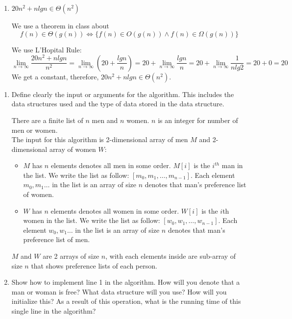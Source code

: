 \documentclass{cpsc413Solutions}
\begin{document}
\begin{problemlist}
\begin{problem}
\begin{answer}
\begin{enumerate}
    \item $20n^2 + nlgn \in \Theta(n^2)$
    
    We use a theorem in class about \[f(n) \in \Theta(g(n)) \Leftrightarrow  \{f(n) \in O(g(n)) \land f(n) \in \Omega(g(n))\}\]
    
    We use L'Hopital Rule:
    $$ \lim_{n\to\infty} \frac{20n^2 + nlgn}{n^2} = \lim_{n\to\infty} (20 + \frac{lgn}{n}) = 20+ \lim_{n\to\infty} \frac{lgn}{n}= 20 + \lim_{n\to\infty} \frac{1}{nlg2}=20+0 = 20$$
    We get a constant, therefore, $20n^2 + nlgn \in \Theta(n^2)$.
    
\end{enumerate}
\end{answer}
\end{problem}


\begin{problem}
\begin{answer}
\begin{enumerate}
    \item Define clearly the input or arguments for the algorithm. This includes the data structures used and the type of data stored in the data structure. 
    
    There are a finite list of $n$ men and $n$ women. $n$ is an integer for number of men or women.\\
    The input for this algorithm is 2-dimensional array of men $M$ and 2-dimensional array of women $W$:
    \begin{itemize}
        \item $M$ has $n$ elements denotes all men in some order. $M[i]$ is the $i^{th}$ man in the list. We write the list as follow: $[m_0,m_1,\dots, m_{n-1}]$. Each element $m_0, m_1 \dots$ in the list is an array of size $n$ denotes that man's preference list of women.
        \item $W$ has $n$ elements denotes all women in some order. $W[i]$ is the $i$th women in the list. We write the list as follow: $[w_0,w_1,\dots, w_{n-1}]$. Each element $w_0, w_1 \dots$ in the list is an array of size $n$ denotes that man's preference list of men.
    \end{itemize}
    $M$ and $W$ are 2 arrays of size $n$, with each elements inside are sub-array of size $n$ that shows preference lists of each person. 
    
    \item Show how to implement line 1 in the algorithm. How will you denote that a man or woman is free? What data structure will you use? How will you initialize this? As a result of this operation, what is the running time of this single line in the algorithm? 
    

\end{enumerate}
\end{answer}
\end{problem}
\end{problemlist}
\end{document}
